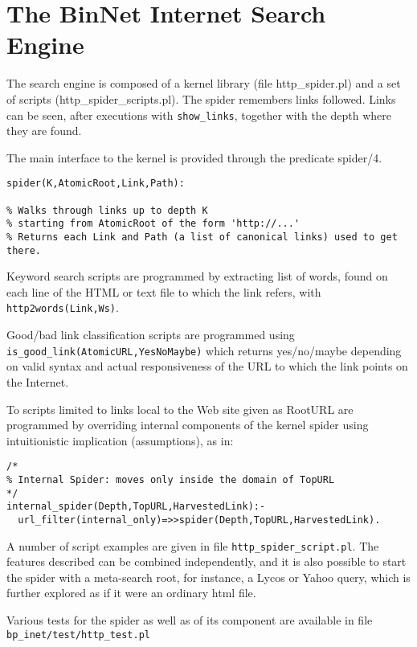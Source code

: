 \documentclass{article}
\begin{document}
\section{The BinNet Internet Search Engine}

The search engine is composed of a kernel library (file http\_spider.pl)
and a set of scripts (http\_spider\_scripts.pl).
The spider remembers links followed. Links can be seen, after executions
with {\tt show\_links}, together with the depth where they are found.

The main interface to the kernel is provided through the predicate
spider/4.

\begin{verbatim}
spider(K,AtomicRoot,Link,Path):

% Walks through links up to depth K
% starting from AtomicRoot of the form 'http://...'
% Returns each Link and Path (a list of canonical links) used to get there.
\end{verbatim}

Keyword search scripts are programmed by extracting list of words,
found on each line of the HTML or text file to which the link refers,
with {\tt http2words(Link,Ws)}.

Good/bad link classification scripts are programmed using
{\tt is\_good\_link(AtomicURL,YesNoMaybe)} which returns yes/no/maybe
depending on valid syntax and actual responsiveness of the URL to
which the link points on the Internet.

To scripts limited to links local to the Web site given as RootURL
are programmed by overriding internal components of the kernel spider
using intuitionistic implication (assumptions), as in:

\begin{verbatim}
/* 
% Internal Spider: moves only inside the domain of TopURL
*/
internal_spider(Depth,TopURL,HarvestedLink):-
  url_filter(internal_only)=>>spider(Depth,TopURL,HarvestedLink).
\end{verbatim}

A number of script examples are given in file {\tt http\_spider\_script.pl}.
The features described can be combined independently, and it is
also possible to start the spider with a meta-search root, for instance,
a Lycos or Yahoo query, which is further explored as if it were an ordinary
html file.

Various tests for the spider as well as of its component
are available in file {\tt bp\_inet/test/http\_test.pl}
\end{document}
